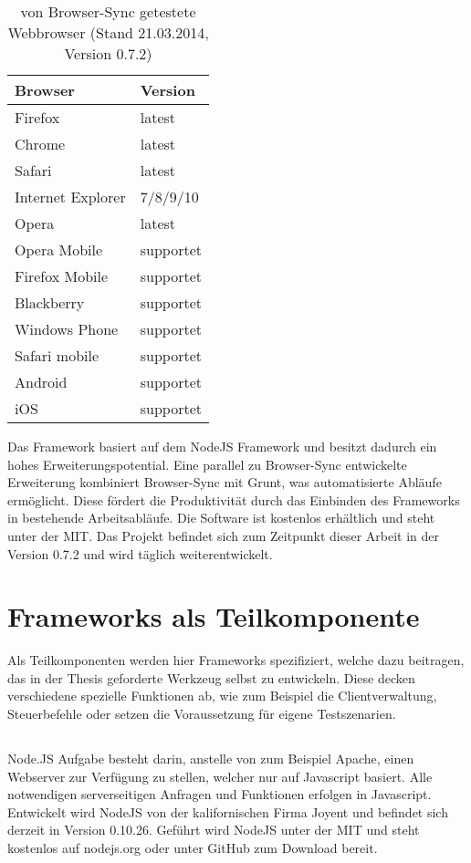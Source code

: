 		\begin{table}[H]
 		\centering
			\begin{tabular}{| p{5cm} | p{5cm} |}
			
			\hline
				Browser 	& 	Version\\
			\hline
			\hline
				Firefox	&	latest\\
				Chrome	&	latest\\
				Safari	&	latest\\
				Internet Explorer	&	7/8/9/10\\
				Opera	&	latest\\
				Opera Mobile	&	supportet\\
				Firefox Mobile	&	supportet\\
				Blackberry	&	supportet\\
				Windows Phone	&	supportet\\
				Safari mobile	&	supportet\\	
				Android	&	supportet\\
				iOS		&	supportet\\
				\hline
				\end{tabular}
			\caption{von Browser-Sync getestete \Gls{Webbrowser} (Stand 21.03.2014, Version 0.7.2)}
	\end{table}
	
	Das \Gls{Framework} basiert auf dem \gls{NodeJS} \Gls{Framework} und besitzt dadurch ein hohes Erweiterungspotential. Eine parallel zu Browser-Sync entwickelte Erweiterung kombiniert Browser-Sync mit \Gls{Grunt}, was automatisierte Abläufe ermöglicht. Diese fördert die Produktivität durch das Einbinden des \Gls{Framework}s in bestehende Arbeitsabläufe. Die Software ist kostenlos erhältlich und steht unter der \Gls{MIT}. Das Projekt befindet sich zum Zeitpunkt dieser Arbeit in der Version 0.7.2 und wird täglich weiterentwickelt.

\pagebreak
\section{Frameworks als Teilkomponente}
	Als Teilkomponenten werden hier \Gls{Framework}s spezifiziert, welche dazu beitragen, das in der Thesis geforderte Werkzeug selbst zu entwickeln. Diese decken verschiedene spezielle Funktionen ab, wie zum Beispiel die Clientverwaltung, Steuerbefehle oder setzen die Voraussetzung für eigene \Gls{Test}szenarien.
	
	\subsection{}
	Node.JS Aufgabe besteht darin, anstelle von zum Beispiel \Gls{Apache}, einen Webserver zur Verfügung zu stellen, welcher nur auf \Gls{Javascript} basiert. Alle notwendigen serverseitigen Anfragen und Funktionen erfolgen in \Gls{Javascript}. Entwickelt wird \gls{NodeJS} von der kalifornischen Firma Joyent und befindet sich derzeit in Version 0.10.26. Geführt wird \gls{NodeJS} unter der \Gls{MIT} und steht kostenlos auf nodejs.org oder unter GitHub zum Download bereit.
	
